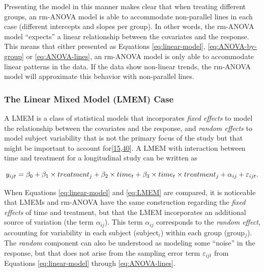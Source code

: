 \documentclass[
]{article}
\begin{document}
Presenting the model in this manner makes clear that when treating different groups, an rm-ANOVA model is able to accommodate non-parallel lines in each case (different intercepts and slopes per group). In other words, the rm-ANOVA model ``expects'' a linear relationship between the covariates and the response. This means that either presented as Equations \eqref{eq:linear-model}, \eqref{eq:ANOVA-by-group} or \eqref{eq:ANOVA-lines}, an rm-ANOVA model is only able to accommodate linear patterns in the data. If the data show non-linear trends, the rm-ANOVA model will approximate this behavior with non-parallel lines.

\hypertarget{LMEM-case}{%
\subsubsection{The Linear Mixed Model (LMEM) Case}\label{LMEM-case}}

A LMEM is a class of statistical models that incorporates \emph{fixed effects} to model the relationship between the covariates and the response, and \emph{random effects} to model subject variability that is not the primary focus of the study but that might be important to account for{[}\protect\hyperlink{ref-pinheiro2006}{15},\protect\hyperlink{ref-west2014}{40}{]}. A LMEM with interaction between time and treatment for a longitudinal study can be written as

\begin{equation}
y_{ijt} = \beta_0+ \beta_1 \times treatment_{j}+ \beta_2 \times time_{t} + \beta_3 \times time_{t}\times treatment_{j}+\alpha_{ij} +\varepsilon_{ijt}\\.
\label{eq:LMEM}
\end{equation}

When Equations \eqref{eq:linear-model} and \eqref{eq:LMEM} are compared, it is noticeable that LMEMs and rm-ANOVA have the same construction regarding the \emph{fixed effects} of time and treatment, but that the LMEM incorporates an additional source of variation (the term \(\alpha_{ij}\)). This term \(\alpha_{ij}\) corresponds to the \emph{random effect}, accounting for variability in each subject (subject\(_i\)) within each group (group\(_j\)). The \emph{random} component can also be understood as modeling some ``noise'' in the response, but that does not arise from the sampling error term \(\varepsilon_{ijt}\) from Equations \eqref{eq:linear-model} through \eqref{eq:ANOVA-lines}.
\end{document}
